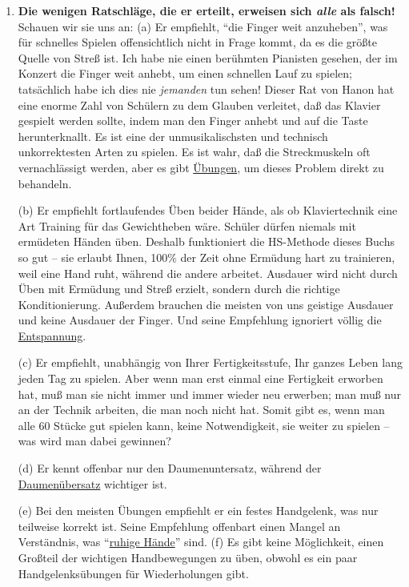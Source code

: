 \begin{enumerate}[label={\roman*.}]
\item \label{c1iii7h7}\textbf{Die wenigen Ratschläge, die er erteilt, erweisen sich \textit{alle} als falsch!}
Schauen wir sie uns an:
(a) Er empfiehlt, \enquote{die Finger weit anzuheben}, was für schnelles Spielen offensichtlich nicht in Frage kommt, da es die größte Quelle von Streß ist.
Ich habe nie einen berühmten Pianisten gesehen, der im Konzert die Finger weit anhebt, um einen schnellen Lauf zu spielen; tatsächlich habe ich dies nie \textit{jemanden} tun sehen!
Dieser Rat von Hanon hat eine enorme Zahl von Schülern zu dem Glauben verleitet, daß das Klavier gespielt werden sollte, indem man den Finger anhebt und auf die Taste herunterknallt.
Es ist eine der unmusikalischsten und technisch unkorrektesten Arten zu spielen.
Es ist wahr, daß die Streckmuskeln oft vernachlässigt werden, aber es gibt \hyperref[c1iii7finger]{Übungen}, um dieses Problem direkt zu behandeln.

(b) Er empfiehlt fortlaufendes Üben beider Hände, als ob Klaviertechnik eine Art Training für das Gewichtheben wäre.
Schüler dürfen niemals mit ermüdeten Händen üben.
Deshalb funktioniert die HS-Methode dieses Buchs so gut -- sie erlaubt Ihnen, 100\% der Zeit ohne Ermüdung hart zu trainieren, weil eine Hand ruht, während die andere arbeitet.
Ausdauer wird nicht durch Üben mit Ermüdung und Streß erzielt, sondern durch die richtige Konditionierung.
Außerdem brauchen die meisten von uns geistige Ausdauer und keine Ausdauer der Finger.
Und seine Empfehlung ignoriert völlig die \hyperref[c1ii14]{Entspannung}.

(c) Er empfiehlt, unabhängig von Ihrer Fertigkeitsstufe, Ihr ganzes Leben lang jeden Tag zu spielen.
Aber wenn man erst einmal eine Fertigkeit erworben hat, muß man sie nicht immer und immer wieder neu erwerben; man muß nur an der Technik arbeiten, die man noch nicht hat.
Somit gibt es, wenn man alle 60 Stücke gut spielen kann, keine Notwendigkeit, sie weiter zu spielen -- was wird man dabei gewinnen?

(d) Er kennt offenbar nur den Daumenuntersatz, während der \hyperref[c1iii5a]{Daumenübersatz} wichtiger ist.

(e) Bei den meisten Übungen empfiehlt er ein festes Handgelenk, was nur teilweise korrekt ist.
Seine Empfehlung offenbart einen Mangel an Verständnis, was \enquote{\hyperref[ruhig]{ruhige Hände}} sind.
(f) Es gibt keine Möglichkeit, einen Großteil der wichtigen Handbewegungen zu üben, obwohl es ein paar Handgelenksübungen für Wiederholungen gibt.




\end{enumerate}
